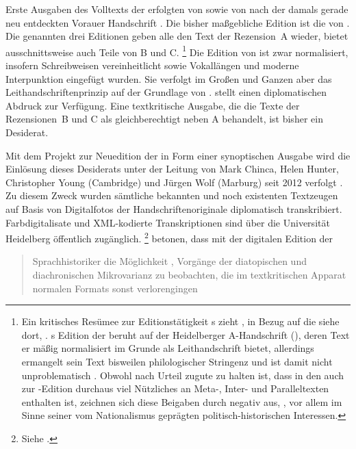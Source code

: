 Erste Ausgaben des Volltexts der \citet{kc} erfolgten von \citet{massmann:kukb}
sowie von \citet{diemer1849} nach der damals gerade neu entdeckten Vorauer
Handschrift \citep{kc:A1}. Die bisher maßgebliche Edition ist die von
\nosh\citet{schroeder1895}. Die genannten drei Editionen geben alle den Text
der Rezension~A wieder, \citeauthor{massmann:kukb} bietet ausschnittsweise auch
Teile von B und C.%
%
	\footnote{Ein kritisches Resümee zur Editionstätigkeit
		\citeauthor{massmann:kukb}s zieht \citet{wolf2023}, in Bezug auf die
		\textcite{kc} siehe dort, .
		\citeauthor{massmann:kukb}s Edition der \textcite{kc} beruht auf der
		Heidelberger A-Handschrift (\citet{kc:H}), deren Text er mäßig
		normalisiert im Grunde als Leithandschrift bietet, allerdings ermangelt
		sein Text bisweilen philologischer Stringenz und ist damit nicht
		unproblematisch \autocite[125--126]{wolf2023}. Obwohl
		\citeauthor{massmann:kukb} nach  Urteil
		zugute zu halten ist, dass in den  auch zur
		\textcite{kc}-Edition durchaus viel Nützliches an Meta-, Inter- und
		Paralleltexten enthalten ist, zeichnen sich diese Beigaben durch
		 negativ aus, , vor allem im Sinne seiner vom Nationalismus geprägten
		politisch-historischen Interessen.%
	}
%
Die Edition von \citeauthor{schroeder1895} ist zwar normalisiert, insofern
Schreibweisen vereinheitlicht sowie Vokallängen und moderne Interpunktion
eingefügt wurden. Sie verfolgt im Großen und Ganzen aber das
Leit\-handschriften\-prinzip auf der Grundlage von \citet{kc:A1}.
\citeauthor{diemer1849} stellt einen diplomatischen Abdruck zur Verfügung. Eine
textkritische Ausgabe, die die Texte der Rezensionen~B und C als
gleichberechtigt neben A behandelt, ist bisher ein Desiderat.

Mit dem Projekt zur Neuedition der \citet{kc} in Form einer synoptischen
Ausgabe wird die Einlösung dieses Desiderats unter der Leitung von Mark Chinca,
Helen Hunter, Christopher Young (Cambridge) und Jürgen Wolf (Marburg) seit 2012
verfolgt \autocite{chincaetal2019b}. Zu diesem Zweck wurden sämtliche bekannten
und noch existenten Textzeugen auf Basis von Digitalfotos der
Handschriften\-originale diplomatisch transkribiert. Farb\-digitalisate und
XML-kodierte Transkriptionen sind über die Universität Heidelberg öffentlich
zugänglich.%
%
	\footnote{Siehe \nocite{kcdigital}.}
%
\citet[287]{chincaetal2019b} betonen, dass mit der digitalen Edition der
 \blockquote{Sprachhistoriker \textelp{}
die Möglichkeit , Vorgänge der dia\-topischen und
dia\-chronischen Mikrovarianz zu beobachten, die im textkritischen Apparat
normalen Formats sonst verlorengingen}.

